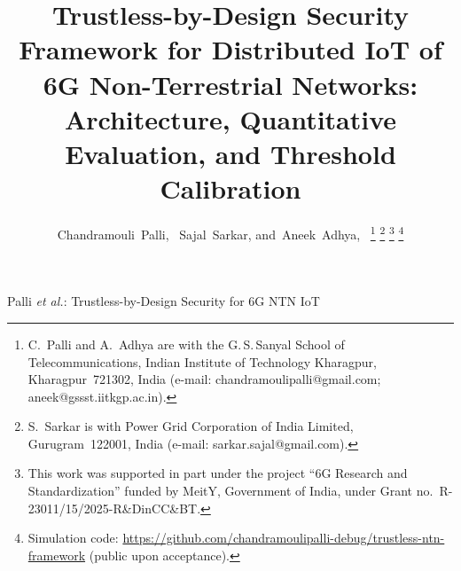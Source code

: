 \documentclass[journal,twoside,10pt]{IEEEtran}
\begin{document}
\title{Trustless-by-Design Security Framework for Distributed IoT of
       6G Non-Terrestrial Networks: Architecture, Quantitative
       Evaluation, and Threshold Calibration}

\author{Chandramouli~Palli,~
        Sajal~Sarkar,
        and~Aneek~Adhya,~%
\thanks{C.~Palli and A.~Adhya are with the G.\,S.\,Sanyal School of
        Telecommunications, Indian Institute of Technology Kharagpur,
        Kharagpur~721302, India
        (e-mail: chandramoulipalli@gmail.com; aneek@gssst.iitkgp.ac.in).}%
\thanks{S.~Sarkar is with Power Grid Corporation of India Limited,
        Gurugram~122001, India (e-mail: sarkar.sajal@gmail.com).}%
\thanks{This work was supported in part under the project ``6G Research
        and Standardization'' funded by MeitY, Government of India,
        under Grant no.\ R-23011/15/2025-R\&DinCC\&BT.}%
\thanks{Simulation code: \url{https://github.com/chandramoulipalli-debug/trustless-ntn-framework}
        (public upon acceptance).}}

%
{Palli \MakeLowercase{\textit{et al.}}: Trustless-by-Design Security for 6G NTN IoT}

\maketitle
\end{document}
